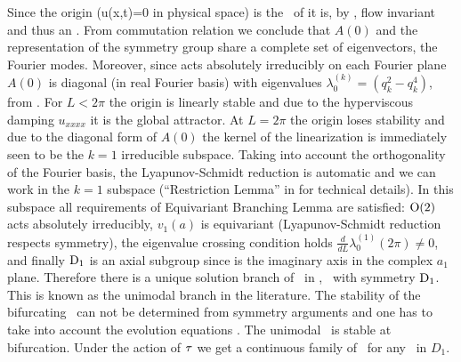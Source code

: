  Since the origin (u(x,t)=0 in physical space) is the \fixedsp\ of  it is,
by , flow invariant and thus
an \eqv. From commutation relation  we conclude that $A(0)$
and the representation of the symmetry group  share a complete
set of eigenvectors, the Fourier modes. 
Moreover, since  acts absolutely irreducibly
on each Fourier plane $A(0)$ is diagonal (in real Fourier basis)
with eigenvalues $\lambda_0^{(k)}=( q_k^2 - q_k^4 )$, from .
For $L<2\pi$
the origin is linearly stable and due to the hyperviscous damping $u_{xxxx}$ it is the global
attractor. At $L=2\pi$ the origin loses stability and due
to the diagonal form of $A(0)$ the kernel of the linearization is immediately seen to be the
$k=1$ irreducible subspace. Taking into account the orthogonality of the Fourier basis, the Lyapunov-Schmidt reduction \cite{golubitsky2002sp} is automatic and we can work in the $k=1$ subspace (\cf ``Restriction Lemma'' in 
for technical details). In this subspace all requirements
of Equivariant Branching Lemma \cite{golubitsky2002sp} are satisfied: $\mathrm{O}(2)$ acts
absolutely irreducibly, $v_1(a)$ is equivariant (Lyapunov-Schmidt reduction respects symmetry),
the eigenvalue crossing condition holds $\frac{d}{d L}\lambda_0^{(1)}(2\pi)\neq 0$, and
finally $\mathrm{D}_{1}$ is an axial subgroup since  is the imaginary axis in the complex $a_1$ plane.
Therefore there is a unique solution branch of \eqva\ in , \ie\ with symmetry $\mathrm{D}_{1}$.
This is known as the unimodal branch in the literature. The stability of the bifurcating \eqv\
can not be determined from symmetry arguments and one has to take into account the evolution equations
\refeq{expan}. The unimodal \eqv\ is stable at bifurcation. Under the action of $\tau$ we
get a continuous family of \eqva\ for any \eqv\ in $D_1$.

